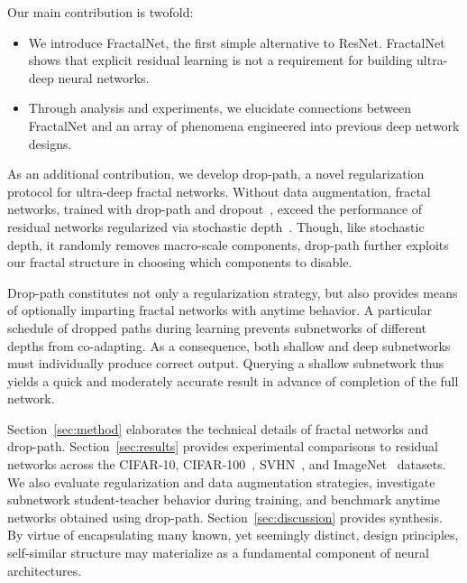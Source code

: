 \documentclass{article}
\newcommand{\fracnet}{FractalNet}
\newcommand{\resnet}{ResNet}
\newcommand{\dropout}{dropout}
\newcommand{\droppath}{drop-path}
\newcommand{\Fracnet}{FractalNet}
\newcommand{\Droppath}{Drop-path}
\begin{document}
Our main contribution is twofold:
\begin{itemize}
   \item{
      We introduce {\fracnet}, the first simple alternative to {\resnet}.
      {\Fracnet} shows that explicit residual learning is not a requirement
      for building ultra-deep neural networks.
   }
   \item{
      Through analysis and experiments, we elucidate connections between
      {\fracnet} and an array of phenomena engineered into previous deep
      network designs.
   }
\end{itemize}

As an additional contribution, we develop {\droppath}, a novel regularization
protocol for ultra-deep fractal networks.  Without data augmentation, fractal
networks, trained with {\droppath} and {\dropout}~\citep{dropout}, exceed the
performance of residual networks regularized via stochastic depth~\citep{
huang2016stochasticdepth}.  Though, like stochastic depth, it randomly removes
macro-scale components, {\droppath} further exploits our fractal structure
in choosing which components to disable.

{\Droppath} constitutes not only a regularization strategy, but also provides
means of optionally imparting fractal networks with anytime behavior.  A
particular schedule of dropped paths during learning prevents subnetworks of
different depths from co-adapting.  As a consequence, both shallow and deep
subnetworks must individually produce correct output.  Querying a shallow
subnetwork thus yields a quick and moderately accurate result in advance of
completion of the full network.

Section~\ref{sec:method} elaborates the technical details of fractal networks
and {\droppath}.  Section~\ref{sec:results} provides experimental comparisons
to residual networks across the CIFAR-10, CIFAR-100~\citep{CIFAR}, SVHN~\citep{
SVHN}, and ImageNet~\citep{deng2009imagenet} datasets.  We also evaluate
regularization and data augmentation strategies, investigate subnetwork
student-teacher behavior during training, and benchmark anytime networks
obtained using {\droppath}.  Section~\ref{sec:discussion} provides synthesis.
By virtue of encapsulating many known, yet seemingly distinct, design
principles, self-similar structure may materialize as a fundamental component
of neural architectures.
 
\end{document}

